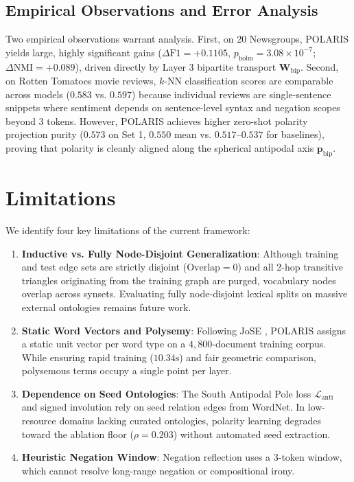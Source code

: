 \documentclass[journal]{IEEEtran}
\begin{document}
\subsection{Empirical Observations and Error Analysis}
Two empirical observations warrant analysis. First, on 20 Newsgroups, POLARIS yields large, highly significant gains ($\Delta\text{F1} = +0.1105$, $p_{\text{holm}} = 3.08 \times 10^{-7}$; $\Delta\text{NMI} = +0.089$), driven directly by Layer 3 bipartite transport $\mathbf{W}_{\text{bip}}$. Second, on Rotten Tomatoes movie reviews, $k$-NN classification scores are comparable across models ($0.583$ vs. $0.597$) because individual reviews are single-sentence snippets where sentiment depends on sentence-level syntax and negation scopes beyond 3 tokens. However, POLARIS achieves higher zero-shot polarity projection purity ($0.573$ on Set 1, $0.550$ mean vs. $0.517$--$0.537$ for baselines), proving that polarity is cleanly aligned along the spherical antipodal axis $\mathbf{p}_{\text{bip}}$.

\section{Limitations}
We identify four key limitations of the current framework:
\begin{enumerate}
    \item \textbf{Inductive vs. Fully Node-Disjoint Generalization}: Although training and test edge sets are strictly disjoint ($\text{Overlap} = 0$) and all 2-hop transitive triangles originating from the training graph are purged, vocabulary nodes overlap across synsets. Evaluating fully node-disjoint lexical splits on massive external ontologies remains future work.
    \item \textbf{Static Word Vectors and Polysemy}: Following JoSE \cite{meng2019spherical}, POLARIS assigns a static unit vector per word type on a $4,800$-document training corpus. While ensuring rapid training ($10.34\text{s}$) and fair geometric comparison, polysemous terms occupy a single point per layer.
    \item \textbf{Dependence on Seed Ontologies}: The South Antipodal Pole loss $\mathcal{L}_{\text{anti}}$ and signed involution rely on seed relation edges from WordNet. In low-resource domains lacking curated ontologies, polarity learning degrades toward the ablation floor ($\rho = 0.203$) without automated seed extraction.
    \item \textbf{Heuristic Negation Window}: Negation reflection uses a 3-token window, which cannot resolve long-range negation or compositional irony.
\end{enumerate}
\end{document}
